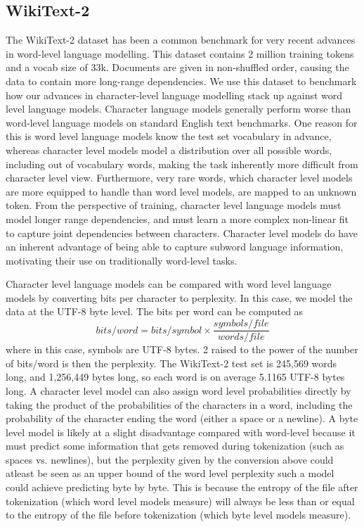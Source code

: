 \documentclass{article}
\begin{document}
\subsection{WikiText-2}
The WikiText-2 dataset has been a common benchmark for very recent advances in word-level language modelling. This dataset contains 2 million training tokens and a vocab size of 33k. Documents are given in non-shuffled order, causing the data to contain more long-range dependencies. We use this dataset to benchmark how our advances in character-level language modelling stack up against word level language models. Character language models generally perform worse than word-level language models on standard English text benchmarks. One reason for this is word level language models know the test set vocabulary in advance, whereas character level models model a distribution over all possible words, including out of vocabulary words, making the task inherently more difficult from character level view. Furthermore, very rare words, which character level models are more equipped to handle than word level models, are mapped to an unknown token. From the perspective of training, character level language models must model longer range dependencies, and must learn a more complex non-linear fit to capture joint dependencies between characters. Character level models do have an inherent advantage of being able to capture subword language information, motivating their use on traditionally word-level tasks.


Character level language models can be compared with word level language models by converting bits per character to perplexity. In this case, we model the data at the UTF-8 byte level. The bits per word can be computed as
\begin{equation}
bits/word = bits/symbol \times \frac{symbols/file}{words/file}
\end{equation}
where in this case, symbols are UTF-8 bytes. 2 raised to the power of the number of bits/word is then the perplexity. The WikiText-2 test set is 245,569 words long, and 1,256,449 bytes long, so each word is on average 5.1165 UTF-8 bytes long. A character level model can also assign word level probabilities directly by taking the product of the probabilities of the characters in a word, including the probability of the character ending the word (either a space or a newline). A byte level model is likely at a slight disadvantage compared with word-level because it must predict some information that gets removed during tokenization (such as spaces vs. newlines), but the perplexity given by the conversion above could atleast be seen as an upper bound of the word level perplexity such a model could achieve predicting byte by byte. This is because the entropy of the file after tokenization (which word level models measure) will always be less than or equal to the entropy of the file before tokenization (which byte level models measure).
\end{document}
